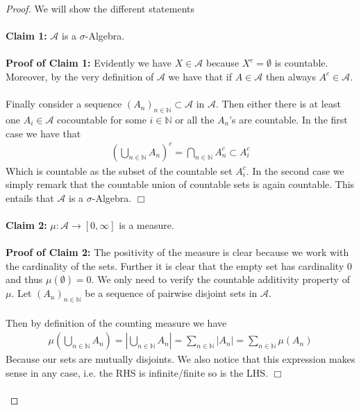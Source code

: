 \documentclass[12pt,a4paper]{article}
\begin{document}
\begin{proof}
We will show the different statements
\\\\
\textbf{Claim 1:} $\mathcal{A}$ is a $\sigma$-Algebra.
\\\\
\textbf{Proof of Claim 1:} Evidently we have $X \in \mathcal{A}$ because $X^c = \emptyset$ is countable. Moreover, by the very definition of $\mathcal{A}$ we have that if $A \in \mathcal{A}$ then always $A^c \in \mathcal{A}$.
\\
\\
 Finally consider a sequence $(A_n)_{n \in \mathbb{N}} \subset \mathcal{A}$ in $\mathcal{A}$. Then either there is at least one $A_i \in \mathcal{A}$ cocountable for some $i \in \mathbb{N}$ or all the $A_n$'s are countable. In the first case we have that
 \begin{align*}
 \left( \bigcup_{n \in \mathbb{N}} A_n \right)^c = \bigcap_{n \in \mathbb{N}} A_n^c \subset A_i^c 
 \end{align*}
 Which is countable as the subset of the countable set $A_i^c$. In the second case we simply remark that the countable union of countable sets is again countable. This entails that $\mathcal{A}$ is a $\sigma$-Algebra.  \hfill $\Box$ 
 \\\\
\textbf{Claim 2:} $\mu : \mathcal{A} \to [0,  \infty]$ is a measure. 
\\\\
\textbf{Proof of Claim 2:} The positivity of the measure is clear because we work with the cardinality of the sets. Further it is clear that the empty set has cardinality $0$ and thus $\mu( \emptyset ) = 0$. We only need to verify the countable additivity property of $\mu$. 
\newpage 
Let $(A_n)_{ n \in \mathbb{N}}$ be a sequence of pairwise disjoint sets in $\mathcal{A}$.\\
\\
Then by definition of the counting measure we have
\begin{align*}
\mu \left( \bigcup_{n \in \mathbb{N}} A_n \right) = \left| \bigcup_{n \in \mathbb{N}} A_n \right| = \sum_{n \in \mathbb{N}} |A_n| = \sum_{n \in \mathbb{N}} \mu(A_n) 
\end{align*}
Because our sets are mutually disjoints. We also notice that this expression makes sense in any case, i.e. the RHS is infinite/finite so is the LHS. \hfill $\Box$
\\
\\

\end{proof}
\end{document}
